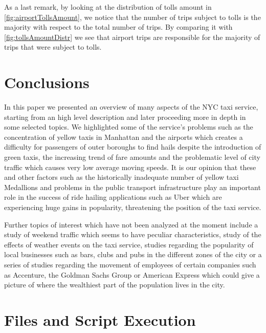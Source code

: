 \documentclass{acm_proc_article-sp-sigmod09}
\begin{document}
As a last remark, by looking at the distribution of tolls amount in \cref{fig:airportTollsAmount}, we notice that the number of trips subject to tolls is the majority with respect to the total number of trips. By comparing it with \cref{fig:tollsAmountDistr} we see that airport trips are responsible for the majority of trips that were subject to tolls.

\section{Conclusions}

In this paper we presented an overview of many aspects of the NYC taxi service, starting from an high level description and later proceeding more in depth in some selected topics. We highlighted some of the service's problems such as the concentration of yellow taxis in Manhattan and the airports which creates a difficulty for passengers of outer boroughs to find hails despite the introduction of green taxis, the increasing trend of fare amounts and the problematic level of city traffic which causes very low average moving speeds. It is our opinion that these and other factors such as the historically inadequate number of yellow taxi Medallions and problems in the public transport infrastructure play an important role in the success of ride hailing applications such as Uber which are experiencing huge gains in popularity, threatening the position of the taxi service.

Further topics of interest which have not been analyzed at the moment include a study of weekend traffic which seems to have peculiar characteristics, study of the effects of weather events on the taxi service, studies regarding the popularity of local businesses such as bars, clubs and pubs in the different zones of the city or a series of studies regarding the movement of employees of certain companies such as Accenture, the Goldman Sachs Group or American Express which could give a picture of where the wealthiest part of the population lives in the city.

%




\balancecolumns
\appendix
\section{Files and Script Execution}
\label{sec:shared_folder}
\end{document}
